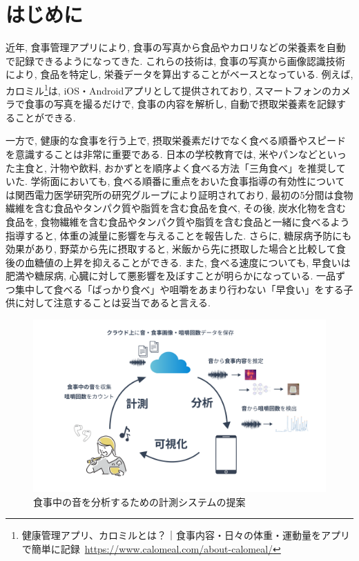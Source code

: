 
\chapter{はじめに}
\label{cha:intro}

近年, 食事管理アプリにより, 食事の写真から食品やカロリなどの栄養素を自動で記録できるようになってきた. これらの技術は, 食事の写真から画像認識技術により, 食品を特定し, 栄養データを算出することがベースとなっている. 例えば, カロミル\footnote{健康管理アプリ、カロミルとは？｜食事内容・日々の体重・運動量をアプリで簡単に記録~\url{https://www.calomeal.com/about-calomeal/}}は, iOS・Androidアプリとして提供されており, スマートフォンのカメラで食事の写真を撮るだけで, 食事の内容を解析し, 自動で摂取栄養素を記録することができる.

一方で, 健康的な食事を行う上で, 摂取栄養素だけでなく食べる順番やスピードを意識することは非常に重要である. 日本の学校教育では, 米やパンなどといった主食と, 汁物や飲料, おかずとを順序よく食べる方法「三角食べ」を推奨していた. 学術面においても, 食べる順番に重点をおいた食事指導の有効性については関西電力医学研究所の研究グループにより証明されており, 最初の5分間は食物繊維を含む食品やタンパク質や脂質を含む食品を食べ, その後, 炭水化物を含む食品を, 食物繊維を含む食品やタンパク質や脂質を含む食品と一緒に食べるよう指導すると, 体重の減量に影響を与えることを報告した\cite{yabe2019107450}. さらに, 糖尿病予防にも効果があり, 野菜から先に摂取すると, 米飯から先に摂取した場合と比較して食後の血糖値の上昇を抑えることができる\cite{tonyobyo53112}. また, 食べる速度についても, 早食いは肥満や糖尿病, 心臓に対して悪影響を及ぼすことが明らかになっている\cite{20249}\cite{beyond_willpower}. 一品ずつ集中して食べる「ばっかり食べ」や咀嚼をあまり行わない「早食い」をする子供に対して注意することは妥当であると言える.

\begin{figure}[t]
  \begin{center}
    \includegraphics[clip,  width=1.0\hsize]{img/system.png}
    \caption{食事中の音を分析するための計測システムの提案}
    \label{fig:system}
  \end{center}
\end{figure}

